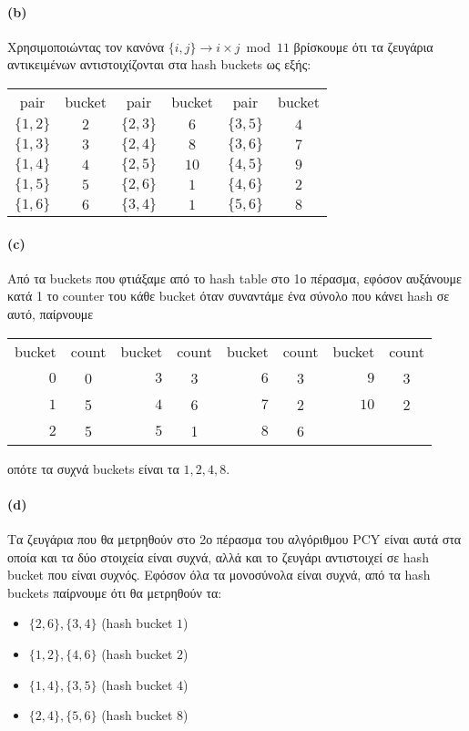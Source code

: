 \documentclass[a4paper,11pt]{article}
\begin{document}
\paragraph{(b)} Χρησιμοποιώντας τον κανόνα $\{i,j\} \rightarrow i \times j \bmod 11$ βρίσκουμε ότι τα ζευγάρια αντικειμένων αντιστοιχίζονται στα hash buckets ως εξής:
\begin{center}
	\begin{tabular}{| c | c || c | c || c | c |}
		\hline
		pair & bucket & pair & bucket & pair & bucket \\ \hhline{|=|=#=|=#=|=|}
		$\{1,2\}$ & $2$ & $\{2,3\}$ & $6$ & $\{3,5\}$ & $4$ \\ \hline
		$\{1,3\}$ & $3$ & $\{2,4\}$ & $8$ & $\{3,6\}$ & $7$ \\ \hline
		$\{1,4\}$ & $4$ & $\{2,5\}$ & $10$ & $\{4,5\}$ & $9$ \\ \hline
		$\{1,5\}$ & $5$ & $\{2,6\}$ & $1$ & $\{4,6\}$ & $2$ \\ \hline
		$\{1,6\}$ & $6$ & $\{3,4\}$ & $1$ & $\{5,6\}$ & $8$ \\ \hline
	\end{tabular}
\end{center}

\paragraph{(c)} Από τα buckets που φτιάξαμε από το hash table στο 1ο πέρασμα, εφόσον αυξάνουμε κατά 1 το counter του κάθε bucket όταν συναντάμε ένα σύνολο που κάνει hash σε αυτό, παίρνουμε
\begin{center}
	\begin{tabular}{| r | c || r | c || r | c || r | c |}
		\hline
		bucket & count & bucket & count & bucket & count & bucket & count \\
		\hhline{|=|=#=|=#=|=#=|=|}
		$0$ & 0 & $3$ & 3 & $6$ & 3 & $9$ & 3 \\ \hline
		$1$ & 5 & $4$ & 6 & $7$ & 2 & $10$ & 2 \\ \hline
		$2$ & 5 & $5$ & 1 & $8$ & 6 &  & \\ \hline
	\end{tabular}
\end{center}
οπότε τα συχνά buckets είναι τα $1,2,4,8$.

\paragraph{(d)} Τα ζευγάρια που θα μετρηθούν στο 2ο πέρασμα του αλγόριθμου PCY είναι αυτά στα οποία και τα δύο στοιχεία είναι συχνά, αλλά και το ζευγάρι αντιστοιχεί σε hash bucket που είναι συχνός.
Εφόσον όλα τα μονοσύνολα είναι συχνά, από τα hash buckets παίρνουμε ότι θα μετρηθούν τα:
\begin{itemize}
	\item $\{2,6\},\{3,4\}$ (hash bucket $1$)
	\item $\{1,2\},\{4,6\}$ (hash bucket $2$)
	\item $\{1,4\},\{3,5\}$ (hash bucket $4$)
	\item $\{2,4\},\{5,6\}$ (hash bucket $8$)
\end{itemize}
\end{document}
